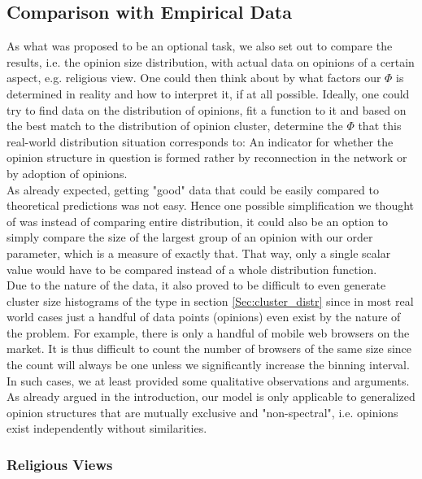\documentclass[11pt]{article}
\begin{document}
\subsection{Comparison with Empirical Data}

As what was proposed to be an optional task, we also set out to compare the results, i.e. the opinion size distribution, with actual data on opinions of a certain aspect, e.g. religious view. One could then think about by what factors our $\Phi$ is determined in reality and how to interpret it, if at all possible. Ideally, one could try to find data on the distribution of opinions, fit a function to it and based on the best match to the distribution of opinion cluster, determine the $\Phi$ that this real-world distribution situation corresponds to: An indicator for whether the opinion structure in question is formed rather by reconnection in the network or by adoption of opinions. \\

As already expected, getting "good" data that could be easily compared to theoretical predictions was not easy. Hence one possible simplification we thought of was instead of comparing entire distribution, it could also be an option to simply compare the size of the largest group of an opinion with our order parameter, which is a measure of exactly that. That way, only a single scalar value would have to be compared instead of a whole distribution function. \\

Due to the nature of the data, it also proved to be difficult to even generate cluster size histograms of the type in section \ref{Sec:cluster_distr} since in most real world cases just a handful of data points (opinions) even exist by the nature of the problem. For example, there is only a handful of mobile web browsers on the market. It is thus difficult to count the number of browsers of the same size since the count will always be one unless we significantly increase the binning interval. In such cases, we at least provided some qualitative observations and arguments. \\

As already argued in the introduction, our model is only applicable to generalized opinion structures that are mutually exclusive and "non-spectral", i.e. opinions exist independently without similarities. 

\subsubsection{Religious Views}
\end{document}
